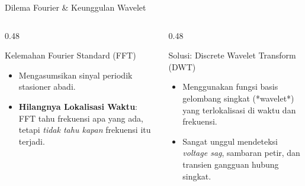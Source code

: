 \documentclass[aspectratio=169, 10pt]{beamer}
\begin{document}
\begin{frame}{Dilema Fourier \& Keunggulan Wavelet}
    \begin{columns}[T]
        \begin{column}{0.48\textwidth}
            \begin{block}{Kelemahan Fourier Standard (FFT)}
                \begin{itemize}
                    \item Mengasumsikan sinyal periodik stasioner abadi.
                    \item \textbf{Hilangnya Lokalisasi Waktu}: FFT tahu frekuensi apa yang ada, tetapi \textit{tidak tahu kapan} frekuensi itu terjadi.
                \end{itemize}
            \end{block}
        \end{column}
        \begin{column}{0.48\textwidth}
            \begin{block}{Solusi: Discrete Wavelet Transform (DWT)}
                \begin{itemize}
                    \item Menggunakan fungsi basis gelombang singkat (*wavelet*) yang terlokalisasi di waktu dan frekuensi.
                    \item Sangat unggul mendeteksi \textit{voltage sag}, sambaran petir, dan transien gangguan hubung singkat.
                \end{itemize}
            \end{block}
        \end{column}
    \end{columns}
\end{frame}
\end{document}
